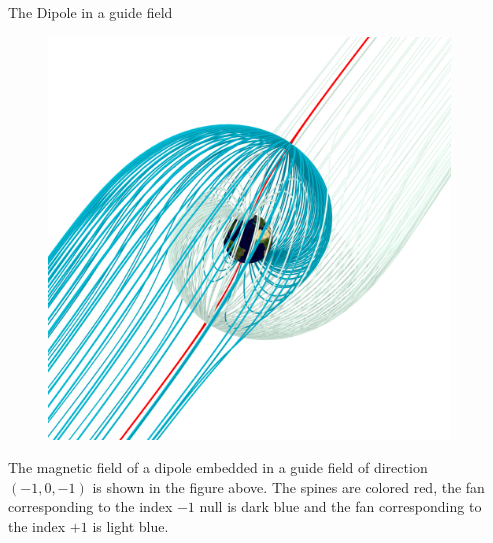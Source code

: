 \documentclass[final]{beamer}
\newlength{\onecolwid}
\newlength{\twocolwid}
\begin{document}
\begin{frame}[t]
\begin{columns}[t]
\begin{column}{\twocolwid}
\begin{columns}[t,totalwidth=\twocolwid]
\begin{column}{\onecolwid}
\end{column} %

\begin{column}{\onecolwid} %

\begin{block}{The Dipole in a guide field}
    \begin{figure}
    \includegraphics[width=\onecolwid]{fig/separatrix_dipole.png}
    \end{figure}

    The magnetic field of a dipole embedded in a guide field of direction $(-1,0,-1)$ is
    shown in the figure above. 
    The spines are colored red, the fan corresponding to the
    index $-1$ null is dark blue and the fan corresponding to the
    index $+1$ is light blue. 


\end{block}


\end{column} %


\end{columns}
\end{column}
\end{columns}
\end{frame}
\end{document}
